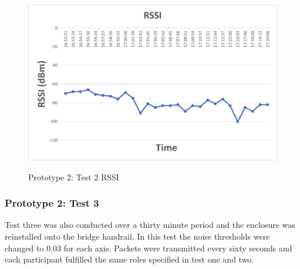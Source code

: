\begin{figure}[H]
	\centering
	\caption{Prototype 2: Test 2 RSSI}
	\includegraphics[width=\textwidth]{Sections/Prototype-Testing/proto2-test2-rssi.png}
	\label{proto2-test2-rssi}
\end{figure}

\subsubsection{Prototype 2: Test 3}
Test three was also conducted over a thirty minute period and the enclosure was reinstalled onto the bridge handrail. In this test the noise thresholds were changed to 0.03 for each axis. Packets were transmitted every sixty seconds and each participant fulfilled the same roles specified in test one and two. 

